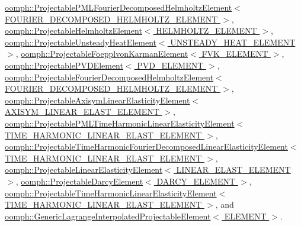 \hyperlink{classoomph_1_1ProjectablePMLFourierDecomposedHelmholtzElement_aa2dd1c8b7262a2719d3c181ccac74c7e}{oomph\+::\+Projectable\+P\+M\+L\+Fourier\+Decomposed\+Helmholtz\+Element$<$ F\+O\+U\+R\+I\+E\+R\+\_\+\+D\+E\+C\+O\+M\+P\+O\+S\+E\+D\+\_\+\+H\+E\+L\+M\+H\+O\+L\+T\+Z\+\_\+\+E\+L\+E\+M\+E\+N\+T $>$}, \hyperlink{classoomph_1_1ProjectableHelmholtzElement_a651580abfd2d133f7cd6cd38e0bcca61}{oomph\+::\+Projectable\+Helmholtz\+Element$<$ H\+E\+L\+M\+H\+O\+L\+T\+Z\+\_\+\+E\+L\+E\+M\+E\+N\+T $>$}, \hyperlink{classoomph_1_1ProjectableUnsteadyHeatElement_a49318b95add2b1ac8c6f0f0cfac195f6}{oomph\+::\+Projectable\+Unsteady\+Heat\+Element$<$ U\+N\+S\+T\+E\+A\+D\+Y\+\_\+\+H\+E\+A\+T\+\_\+\+E\+L\+E\+M\+E\+N\+T $>$}, \hyperlink{classoomph_1_1ProjectableFoepplvonKarmanElement_a1fd58ba72daf96c1849cb48350684d74}{oomph\+::\+Projectable\+Foepplvon\+Karman\+Element$<$ F\+V\+K\+\_\+\+E\+L\+E\+M\+E\+N\+T $>$}, \hyperlink{classoomph_1_1ProjectablePVDElement_afc3aa618b5fe62f6389a620b45fcae2a}{oomph\+::\+Projectable\+P\+V\+D\+Element$<$ P\+V\+D\+\_\+\+E\+L\+E\+M\+E\+N\+T $>$}, \hyperlink{classoomph_1_1ProjectableFourierDecomposedHelmholtzElement_a7ba6062f40bc46b7c3e09fb77857aa19}{oomph\+::\+Projectable\+Fourier\+Decomposed\+Helmholtz\+Element$<$ F\+O\+U\+R\+I\+E\+R\+\_\+\+D\+E\+C\+O\+M\+P\+O\+S\+E\+D\+\_\+\+H\+E\+L\+M\+H\+O\+L\+T\+Z\+\_\+\+E\+L\+E\+M\+E\+N\+T $>$}, \hyperlink{classoomph_1_1ProjectableAxisymLinearElasticityElement_a86f342760e932e4ae53f0fe36d784bd0}{oomph\+::\+Projectable\+Axisym\+Linear\+Elasticity\+Element$<$ A\+X\+I\+S\+Y\+M\+\_\+\+L\+I\+N\+E\+A\+R\+\_\+\+E\+L\+A\+S\+T\+\_\+\+E\+L\+E\+M\+E\+N\+T $>$}, \hyperlink{classoomph_1_1ProjectablePMLTimeHarmonicLinearElasticityElement_abc19b33b7f42c1dae69f0b64c7e05c61}{oomph\+::\+Projectable\+P\+M\+L\+Time\+Harmonic\+Linear\+Elasticity\+Element$<$ T\+I\+M\+E\+\_\+\+H\+A\+R\+M\+O\+N\+I\+C\+\_\+\+L\+I\+N\+E\+A\+R\+\_\+\+E\+L\+A\+S\+T\+\_\+\+E\+L\+E\+M\+E\+N\+T $>$}, \hyperlink{classoomph_1_1ProjectableTimeHarmonicFourierDecomposedLinearElasticityElement_a74c726d77137a9693a37d3b01eb321b8}{oomph\+::\+Projectable\+Time\+Harmonic\+Fourier\+Decomposed\+Linear\+Elasticity\+Element$<$ T\+I\+M\+E\+\_\+\+H\+A\+R\+M\+O\+N\+I\+C\+\_\+\+L\+I\+N\+E\+A\+R\+\_\+\+E\+L\+A\+S\+T\+\_\+\+E\+L\+E\+M\+E\+N\+T $>$}, \hyperlink{classoomph_1_1ProjectableLinearElasticityElement_a67ba02d25acfba604dbdc3446cab9158}{oomph\+::\+Projectable\+Linear\+Elasticity\+Element$<$ L\+I\+N\+E\+A\+R\+\_\+\+E\+L\+A\+S\+T\+\_\+\+E\+L\+E\+M\+E\+N\+T $>$}, \hyperlink{classoomph_1_1ProjectableDarcyElement_a2dad4f7a1d4bdeeb2bc928677572db03}{oomph\+::\+Projectable\+Darcy\+Element$<$ D\+A\+R\+C\+Y\+\_\+\+E\+L\+E\+M\+E\+N\+T $>$}, \hyperlink{classoomph_1_1ProjectableTimeHarmonicLinearElasticityElement_af5b374081d576de7e29fe579ea06fd7d}{oomph\+::\+Projectable\+Time\+Harmonic\+Linear\+Elasticity\+Element$<$ T\+I\+M\+E\+\_\+\+H\+A\+R\+M\+O\+N\+I\+C\+\_\+\+L\+I\+N\+E\+A\+R\+\_\+\+E\+L\+A\+S\+T\+\_\+\+E\+L\+E\+M\+E\+N\+T $>$}, and \hyperlink{classoomph_1_1GenericLagrangeInterpolatedProjectableElement_ac9e67d23b865eb118acbca2eea74c8a3}{oomph\+::\+Generic\+Lagrange\+Interpolated\+Projectable\+Element$<$ E\+L\+E\+M\+E\+N\+T $>$}.



